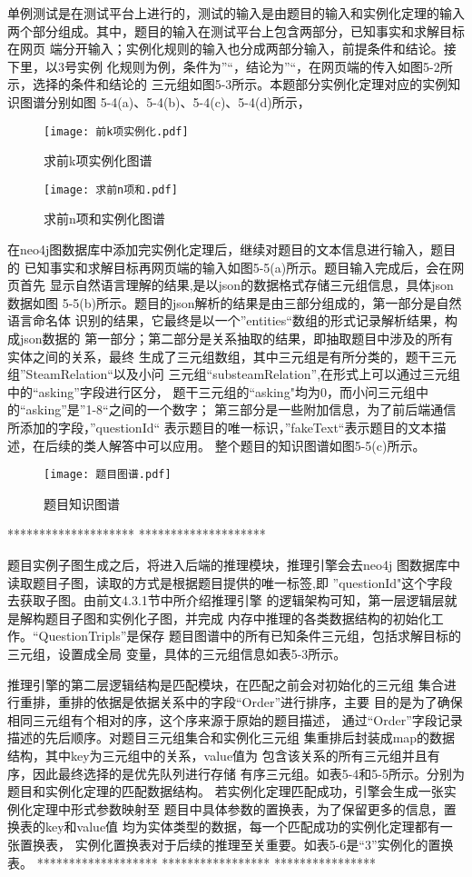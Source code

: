 \documentclass{standalone}
\begin{document}
单例测试是在测试平台上进行的，测试的输入是由题目的输入和实例化定理的输入
两个部分组成。其中，题目的输入在测试平台上包含两部分，已知事实和求解目标在网页
端分开输入；实例化规则的输入也分成两部分输入，前提条件和结论。接下里，以3号实例
化规则为例，条件为”“，结论为”“，在网页端的传入如图5-2所示，选择的条件和结论的
三元组如图5-3所示。本题部分实例化定理对应的实例知识图谱分别如图
5-4(a)、5-4(b)、5-4(c)、5-4(d)所示，
\begin{figure}[htbp]
	\texttt{[image: 前k项实例化.pdf]}
	\caption{求前k项实例化图谱}
	\label{前k项实例化}
\end{figure}

\begin{figure}[htbp]
	\texttt{[image: 求前n项和.pdf]}
	\caption{求前n项和实例化图谱}
	\label{求前n项和}
\end{figure}

在neo4j图数据库中添加完实例化定理后，继续对题目的文本信息进行输入，题目的
已知事实和求解目标再网页端的输入如图5-5(a)所示。题目输入完成后，会在网页首先
显示自然语言理解的结果,是以json的数据格式存储三元组信息，具体json数据如图
5-5(b)所示。题目的json解析的结果是由三部分组成的，第一部分是自然语言命名体
识别的结果，它最终是以一个”entities“数组的形式记录解析结果，构成json数据的
第一部分；第二部分是关系抽取的结果，即抽取题目中涉及的所有实体之间的关系，最终
生成了三元组数组，其中三元组是有所分类的，题干三元组”SteamRelation“以及小问
三元组“substeamRelation”,在形式上可以通过三元组中的“asking”字段进行区分，
题干三元组的“asking"均为0，而小问三元组中的“asking”是”1-8“之间的一个数字；
第三部分是一些附加信息，为了前后端通信所添加的字段，”questionId“
表示题目的唯一标识，”fakeText“表示题目的文本描述，在后续的类人解答中可以应用。
整个题目的知识图谱如图5-5(c)所示。
\begin{figure}[htbp]
	\texttt{[image: 题目图谱.pdf]}
	\caption{题目知识图谱}
	\label{题目图谱}
\end{figure}
********************
********************

题目实例子图生成之后，将进入后端的推理模块，推理引擎会去neo4j
图数据库中读取题目子图，读取的方式是根据题目提供的唯一标签,即
”questionId"这个字段去获取子图。由前文4.3.1节中所介绍推理引擎
的逻辑架构可知，第一层逻辑层就是解构题目子图和实例化子图，并完成
内存中推理的各类数据结构的初始化工作。“QuestionTripls”是保存
题目图谱中的所有已知条件三元组，包括求解目标的三元组，设置成全局
变量，具体的三元组信息如表5-3所示。

推理引擎的第二层逻辑结构是匹配模块，在匹配之前会对初始化的三元组
集合进行重排，重排的依据是依据关系中的字段“Order”进行排序，主要
目的是为了确保相同三元组有个相对的序，这个序来源于原始的题目描述，
通过“Order”字段记录描述的先后顺序。对题目三元组集合和实例化三元组
集重排后封装成map的数据结构，其中key为三元组中的关系，value值为
包含该关系的所有三元组并且有序，因此最终选择的是优先队列进行存储
有序三元组。如表5-4和5-5所示。分别为题目和实例化定理的匹配数据结构。
若实例化定理匹配成功，引擎会生成一张实例化定理中形式参数映射至
题目中具体参数的置换表，为了保留更多的信息，置换表的key和value值
均为实体类型的数据，每一个匹配成功的实例化定理都有一张置换表，
实例化置换表对于后续的推理至关重要。如表5-6是“3”实例化的置换表。
*******************
*****************
****************
\end{document}
